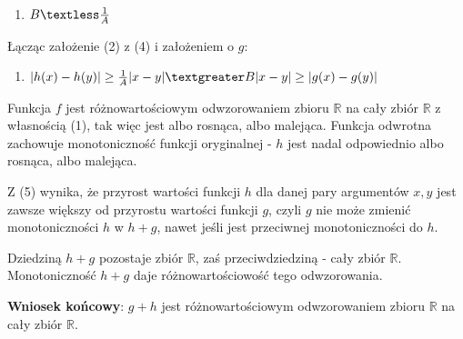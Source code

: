\documentclass[10pt,onecolumn]{article}
\begin{document}
\begin{enumerate}[(4)]
\item $B \textless \frac{1}{A}$
\end{enumerate}

Łącząc założenie (2) z (4) i założeniem o $g$:

\begin{enumerate}[(5)]
\item $ \lvert h(x)-h(y) \rvert \geq \frac{1}{A} \lvert x-y \rvert \textgreater B \lvert x-y \rvert \geq  \lvert g(x)-g(y) \rvert$
\end{enumerate}

Funkcja $f$ jest różnowartościowym odwzorowaniem zbioru $\mathbb{R}$  na cały zbiór $\mathbb{R}$ z własnością (1), tak więc jest albo rosnąca, albo malejąca. Funkcja odwrotna zachowuje monotoniczność funkcji oryginalnej - $h$ jest nadal odpowiednio albo rosnąca, albo malejąca. \par Z (5) wynika, że przyrost wartości funkcji $h$ dla danej pary argumentów $x, y$ jest zawsze większy od przyrostu wartości funkcji $g$, czyli $g$ nie może zmienić monotoniczności $h$ w $h+g$, nawet jeśli jest przeciwnej monotoniczności do $h$. \par Dziedziną $h+g$ pozostaje zbiór $\mathbb{R}$, zaś przeciwdziedziną - cały zbiór $\mathbb{R}$. Monotoniczność $h+g$ daje różnowartościowość tego odwzorowania.

\textbf{Wniosek końcowy}: $g + h$  jest różnowartościowym odwzorowaniem zbioru $\mathbb{R}$  na cały zbiór $\mathbb{R}$.  \\ \\ \\
\end{document}
